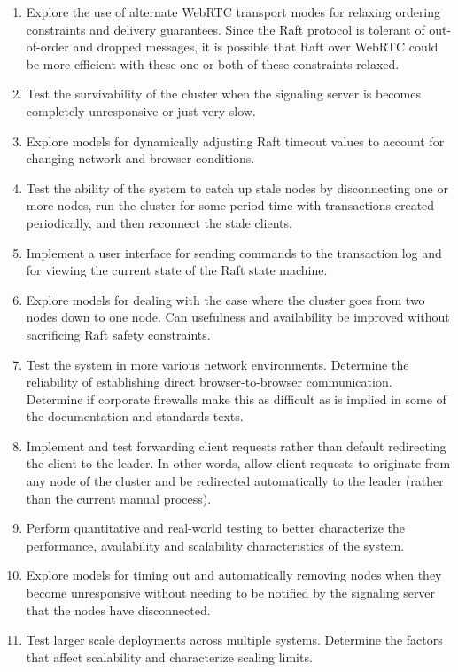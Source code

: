 \documentclass[9pt]{extarticle}
\begin{document}
\begin{multicols}{2}
\begin{enumerate}
\item Explore the use of alternate WebRTC transport modes for relaxing
  ordering constraints and delivery guarantees. Since the Raft
  protocol is tolerant of out-of-order and dropped messages, it is
  possible that Raft over WebRTC could be more efficient with these
  one or both of these constraints relaxed.
\item Test the survivability of the cluster when the signaling server is
  becomes completely unresponsive or just very slow.
\item Explore models for dynamically adjusting Raft timeout values to
  account for changing network and browser conditions.
\item Test the ability of the system to catch up stale nodes by
  disconnecting one or more nodes, run the cluster for some period
  time with transactions created periodically, and then reconnect the stale
  clients.
\item Implement a user interface for sending commands to the transaction
  log and for viewing the current state of the Raft state machine.
\item Explore models for dealing with the case where the cluster goes from
  two nodes down to one node. Can usefulness and availability be
  improved without sacrificing Raft safety constraints.
\item Test the system in more various network environments. Determine the
  reliability of establishing direct browser-to-browser communication.
  Determine if corporate firewalls make this as difficult as is
  implied in some of the documentation and standards texts.
\item Implement and test forwarding client requests rather than default
  redirecting the client to the leader. In other words, allow client
  requests to originate from any node of the cluster and be redirected
  automatically to the leader (rather than the current manual
  process).
\item Perform quantitative and real-world testing to better characterize
  the performance, availability and scalability characteristics of the
  system.
\item Explore models for timing out and automatically removing nodes
  when they become unresponsive without needing to be notified by the
  signaling server that the nodes have disconnected.
\item Test larger scale deployments across multiple systems. Determine the
  factors that affect scalability and characterize scaling limits.

\end{enumerate}
\end{multicols}
\end{document}
